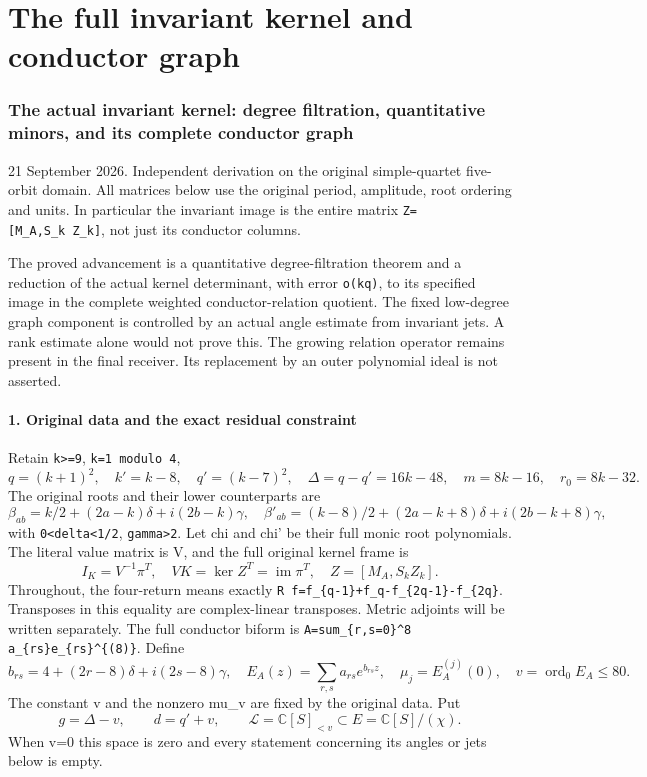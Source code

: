 \documentclass[11pt]{article}
\begin{document}
\clearpage\part{The full invariant kernel and conductor graph}
\label{part:4}
\section{The actual invariant kernel: degree filtration, quantitative minors, and its complete conductor graph}\label{the-actual-invariant-kernel-degree-filtration-quantitative-minors-and-its-complete-conductor-graph}

21 September 2026. Independent derivation on the original simple-quartet five-orbit domain. All matrices below use the original period, amplitude, root ordering and units. In particular the invariant image is the entire matrix \texttt{Z={[}M\_A,S\_k\ Z\_k{]}}, not just its conductor columns.

The proved advancement is a quantitative degree-filtration theorem and a reduction of the actual kernel determinant, with error \texttt{o(kq)}, to its specified image in the complete weighted conductor-relation quotient. The fixed low-degree graph component is controlled by an actual angle estimate from invariant jets. A rank estimate alone would not prove this. The growing relation operator remains present in the final receiver. Its replacement by an outer polynomial ideal is not asserted.

\subsection{1. Original data and the exact residual constraint}\label{original-data-and-the-exact-residual-constraint}

Retain \texttt{k\textgreater{}=9}, \texttt{k=1\ modulo\ 4}, \[
q=(k+1)^2,\quad k'=k-8,\quad q'=(k-7)^2,\quad
\Delta=q-q'=16k-48,\quad m=8k-16,\quad r_0=8k-32.
\tag{KF1}
\] The original roots and their lower counterparts are \[
\beta_{ab}=k/2+(2a-k)\delta+i(2b-k)\gamma,
\quad
\beta'_{ab}=(k-8)/2+(2a-k+8)\delta+i(2b-k+8)\gamma,
\] with \texttt{0\textless{}delta\textless{}1/2}, \texttt{gamma\textgreater{}2}. Let chi and chi' be their full monic root polynomials. The literal value matrix is V, and the full original kernel frame is \[
I_K=V^{-1}\pi^T,\quad
VK=\ker Z^T=\operatorname{im}\pi^T,
\quad Z=[M_A,S_kZ_k].
\tag{KF2}
\] Throughout, the four-return means exactly \nolinkurl{R f=f_{q-1}+f_q-f_{2q-1}-f_{2q}}. Transposes in this equality are complex-linear transposes. Metric adjoints will be written separately. The full conductor biform is \nolinkurl{A=sum_{r,s=0}^8 a_{rs}e_{rs}^{(8)}}. Define \[
b_{rs}=4+(2r-8)\delta+i(2s-8)\gamma,\quad
E_A(z)=\sum_{r,s}a_{rs}e^{b_{rs}z},\quad
\mu_j=E_A^{(j)}(0),\quad v=\operatorname{ord}_0E_A\le80.
\tag{KF3}
\] The constant v and the nonzero mu\_v are fixed by the original data. Put \[
g=\Delta-v,\qquad d=q'+v,\qquad
\mathcal L=\mathbb C[S]_{<v}\subset E=\mathbb C[S]/(\chi).
\] When v=0 this space is zero and every statement concerning its angles or jets below is empty.
\end{document}
